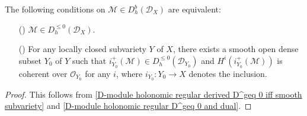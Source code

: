 \begin{lemma}\label{D-module holonomic regular derived D^geq 0 iff smooth subvariety inverse}
The following conditions on $\mathscr{M}\in D^b_h(\mathscr{D}_X)$ are equivalent:
\begin{enumerate}
    \item[(\rmnum{1})] $\mathscr{M}\in D^{\leq 0}_h(\mathscr{D}_X)$.
    \item[(\Rmnum{2})] For any locally closed subvariety $Y$ of $X$, there exists a smooth open dense subset $Y_0$ of $Y$ such that $i_{Y_0}^+(\mathscr{M})\in D^{\leq 0}_h(\mathscr{D}_{Y_0})$ and $H^i(i_{Y_0}^+(\mathscr{M}))$ is coherent over $\mathscr{O}_{Y_0}$ for any $i$, where $i_{Y_0}:Y_0\to X$ denotes the inclusion.
\end{enumerate}
\end{lemma}
\begin{proof}
This follows from \cref{D-module holonomic regular derived D^geq 0 iff smooth subvariety} and \cref{D-module holonomic regular D^geq 0 and dual}.
\end{proof}

